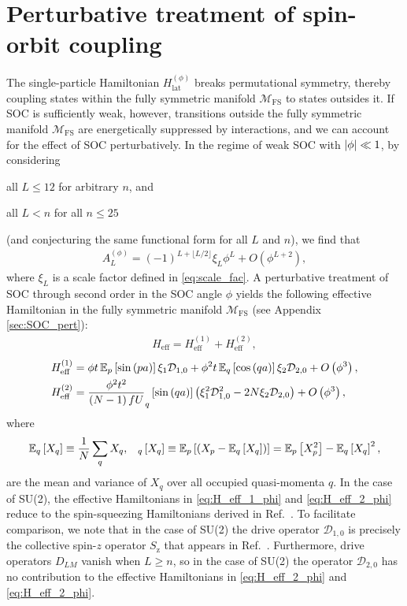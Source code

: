 \documentclass[nofootinbib,notitlepage,11pt]{revtex4-2}
\renewcommand{\t}{\text} %
\newcommand{\f}[2]{\dfrac{#1}{#2}} %
\newcommand{\p}[1]{\left(#1\right)} %
\renewcommand{\sp}[1]{\left[#1\right]} %
\newcommand{\1}{\mathds{1}}
\newcommand{\z}{\text{z}}
\newcommand{\D}{\mathcal{D}}
\newcommand{\M}{\mathcal{M}}
\newcommand{\EE}{\mathbb{E}}
\newcommand{\FS}{\text{FS}}
\let\var\relax
\DeclareMathOperator{\var}{var}
\begin{document}
\section{Perturbative treatment of spin-orbit coupling}
\label{sec:pert_SOC}

The single-particle Hamiltonian $H_{\t{lat}}^{(\phi)}$ breaks
permutational symmetry, thereby coupling states within the fully
symmetric manifold $\M_\FS$ to states outsides it.  If SOC is
sufficiently weak, however, transitions outside the fully symmetric
manifold $\M_\FS$ are energetically suppressed by interactions, and we
can account for the effect of SOC perturbatively.  In the regime of
weak SOC with $\abs{\phi}\ll1$, by considering
\begin{enumerate*}
\item all $L\le12$ for arbitrary $n$, and
\item all $L<n$ for all $n\le25$
\end{enumerate*}
(and conjecturing the same functional form for all $L$ and $n$), we
find that
\begin{align}
  A_L^{(\phi)}
  = \p{-1}^{L+\lfloor L/2\rfloor} \xi_L \phi^L + O\p{\phi^{L+2}},
  \label{eq:A_L_phi_small}
\end{align}
where $\xi_L$ is a scale factor defined in \eqref{eq:scale_fac}.  A
perturbative treatment of SOC through second order in the SOC angle
$\phi$ yields the following effective Hamiltonian in the fully
symmetric manifold $\M_\FS$ (see Appendix \ref{sec:SOC_pert}):
\begin{align}
  H_{\t{eff}} = H_{\t{eff}}^{(1)} + H_{\t{eff}}^{(2)},
\end{align}
\begin{align}
  H_{\t{eff}}^{(1)}
  &= \phi t \, \EE_p\sp{\sin\p{pa}} \xi_1 \D_{1,0}
  + \phi^2 t \, \EE_q\sp{\cos\p{qa}} \xi_2 \D_{2,0}
  + O\p{\phi^3},
  \label{eq:H_eff_1_phi} \\
  H_{\t{eff}}^{(2)}
  &= \f{\phi^2 t^2}{\p{N-1}fU} \var_q\sp{\sin\p{qa}}
  \p{\xi_1^2 \D_{1,0}^2 - 2 N \xi_2 \D_{2,0}}
  + O\p{\phi^3},
  \label{eq:H_eff_2_phi}
\end{align}
where
\begin{align}
  \EE_q\sp{X_q} \equiv \f1N \sum_q X_q,
  &&
  \var_q\sp{X_q} \equiv \EE_p\sp{\p{X_p-\EE_q\sp{X_q}}}
  = \EE_p\sp{X_p^2}-\EE_q\sp{X_q}^2,
\end{align}
are the mean and variance of $X_q$ over all occupied quasi-momenta
$q$.  In the case of SU(2), the effective Hamiltonians in
\eqref{eq:H_eff_1_phi} and \eqref{eq:H_eff_2_phi} reduce to the
spin-squeezing Hamiltonians derived in Ref.~\cite{he2019engineering}.
To facilitate comparison, we note that in the case of SU(2) the drive
operator $\D_{1,0}$ is precisely the collective spin-$z$ operator
$S_\z$ that appears in Ref.~\cite{he2019engineering}.  Furthermore,
drive operators $D_{LM}$ vanish when $L\ge n$, so in the case of SU(2)
the operator $\D_{2,0}$ has no contribution to the effective
Hamiltonians in \eqref{eq:H_eff_2_phi} and \eqref{eq:H_eff_2_phi}.
\end{document}
